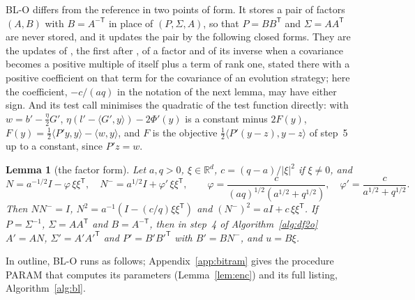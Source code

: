 \documentclass[11pt]{amsart}
\newtheorem{lemma}[theorem]{Lemma}
\theoremstyle{definition}
\numberwithin{equation}{section}
\newcommand{\R}{\mathbb{R}}
\newcommand{\ip}[1]{\langle #1\rangle}
\begin{document}
BL-O differs from the reference in two points of form. It stores a pair of factors $(A,B)$ with $B=A^{-\mathsf T}$ in place of $(P,\Sigma,A)$, so that $P=BB^{\mathsf T}$ and $\Sigma=AA^{\mathsf T}$ are never stored, and it updates the pair by the following closed forms. They are the updates of \cite[Theorems~1 and~2]{SHI09}, the first after \cite{IHS06}, of a factor and of its inverse when a covariance becomes a positive multiple of itself plus a term of rank one, stated there with a positive coefficient on that term for the covariance of an evolution strategy; here the coefficient, $-c/(aq)$ in the notation of the next lemma, may have either sign. And its test call minimises the quadratic of the test function directly: with $w=b'-\frac\eta2G'$, $\eta(l'-\ip{G',y})-2\Phi'(y)$ is a constant minus $2F(y)$, $F(y)=\frac12\ip{P'y,y}-\ip{w,y}$, and $F$ is the objective $\frac12\ip{P'(y-z),y-z}$ of step~5 up to a constant, since $P'z=w$.

\begin{lemma}[the factor form]\label{lem:factor}
Let $a,q>0$, $\xi\in\R^d$, $c=(q-a)/|\xi|^2$ if $\xi\ne0$, and
\[
N=a^{-1/2}I-\varphi\,\xi\xi^{\mathsf T},\quad N^{-}=a^{1/2}I+\varphi'\,\xi\xi^{\mathsf T},\qquad\varphi=\frac c{(aq)^{1/2}(a^{1/2}+q^{1/2})},\quad\varphi'=\frac c{a^{1/2}+q^{1/2}} .
\]
Then $NN^-=I$, $N^2=a^{-1}(I-(c/q)\xi\xi^{\mathsf T})$ and $(N^-)^2=aI+c\,\xi\xi^{\mathsf T}$. If $P=\Sigma^{-1}$, $\Sigma=AA^{\mathsf T}$ and $B=A^{-\mathsf T}$, then in step~4 of Algorithm~\ref{alg:df2o} $A'=AN$, $\Sigma'=A'A'^{\mathsf T}$ and $P'=B'B'^{\mathsf T}$ with $B'=BN^-$, and $u=B\xi$.
\end{lemma}

In outline, BL-O runs as follows; Appendix~\ref{app:bitram} gives the procedure PARAM that computes its parameters (Lemma~\ref{lem:enc}) and its full listing, Algorithm~\ref{alg:bl}.
\end{document}

